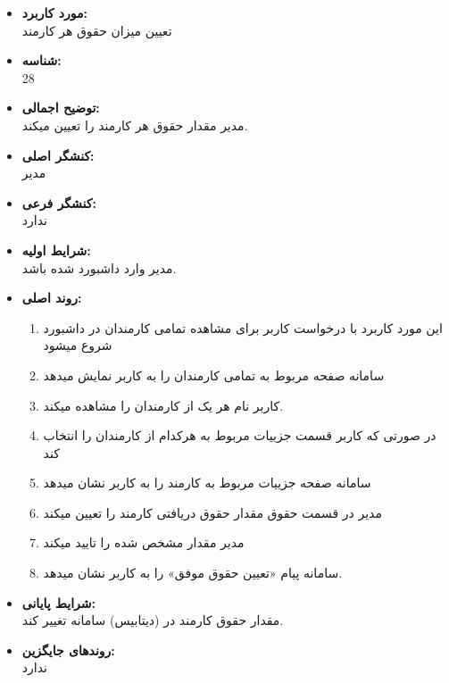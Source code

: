\documentclass{article}
\begin{document}
\begin{itemize}
\item \textbf{مورد کاربرد:}\\
تعیین میزان حقوق هر کارمند
\item \textbf{شناسه:}\\
28
\item \textbf{توضیح اجمالی:}\\
مدیر مقدار حقوق هر کارمند را تعیین میکند.
\item \textbf{کنشگر اصلی:}\\
مدیر
\item \textbf{کنشگر فرعی:}\\
ندارد
\item \textbf{شرایط اولیه:}\\
مدیر وارد داشبورد شده باشد.
\item \textbf{روند اصلی:}\\
\begin{enumerate}
\item  این مورد کاربرد با درخواست کاربر برای مشاهده تمامی  کارمندان در داشبورد شروع میشود
\item سامانه صفحه مربوط به تمامی کارمندان را به کاربر نمایش میدهد
\item کاربر نام هر یک از کارمندان را مشاهده میکند.
\item  در صورتی که کاربر قسمت جزییات مربوط به هرکدام از کارمندان را انتخاب کند
\item سامانه صفحه جزییات مربوط به کارمند را به کاربر نشان میدهد
\item مدیر در قسمت حقوق مقدار حقوق دریافتی کارمند را تعیین میکند
\item مدیر مقدار مشخص شده را تایید میکند
\item سامانه پیام «تعیین حقوق موفق» را به کاربر نشان میدهد.
\end{enumerate}
\item \textbf{شرایط پایانی:}\\ 
مقدار حقوق کارمند در (دیتابیس) سامانه تغییر کند.
\item \textbf{روندهای جایگزین:}\\
ندارد
\end{itemize}
\noindent\makebox[\linewidth]{\rule{\paperwidth}{0.4pt}}
\end{document}
